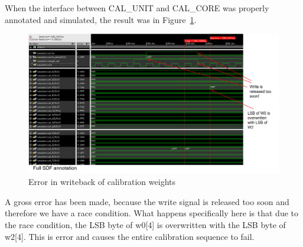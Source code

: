 When the interface between CAL\_UNIT and CAL\_CORE was properly annotated and simulated, the result was in Figure~\ref{fig:errorcalwrite}.
\begin{figure}[htb]
\centering
\begin{center}
\includegraphics[width=1.0\textwidth]{figures/ErrorCalWrite.png}
\end{center}
\caption{Error in writeback of calibration weights}
\label{fig:errorcalwrite}
\end{figure}

A gross error has been made, because the write signal is released too soon and therefore we have a race condition. What happens specifically here is that due to the race condition, the LSB byte of w0[4] is overwritten with the LSB byte of w2[4]. This is error and causes the entire calibration sequence to fail.

